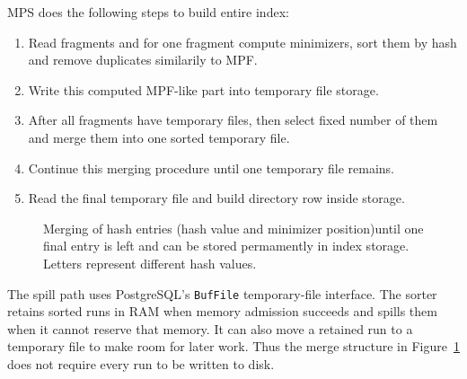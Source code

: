 \begin{minipage}{\linewidth}
MPS does the following steps to build entire index:
\begin{enumerate}
  \item Read fragments and for one fragment compute minimizers, sort them by hash and remove duplicates similarily to MPF.
  \item Write this computed MPF-like part into temporary file storage.
  \item After all fragments have temporary files, then select fixed number of them and merge them into one sorted temporary file.
  \item Continue this merging procedure until one temporary file remains.
  \item Read the final temporary file and build directory row inside storage.
\end{enumerate}
\end{minipage}

\begin{figure}[htbp]
\centering
{}
\caption{Merging of hash entries (hash value and minimizer position)until one final entry is left and can be stored permamently in index storage. Letters represent different hash values.}
\label{fig:index-mps-merge}
\end{figure}

The spill path uses PostgreSQL's \texttt{BufFile} temporary-file interface.
The sorter retains sorted runs in RAM when memory admission succeeds and
spills them when it cannot reserve that memory. It can also move a retained
run to a temporary file to make room for later work. Thus the merge structure
in Figure~\ref{fig:index-mps-merge} does not require every run to be written
to disk.
